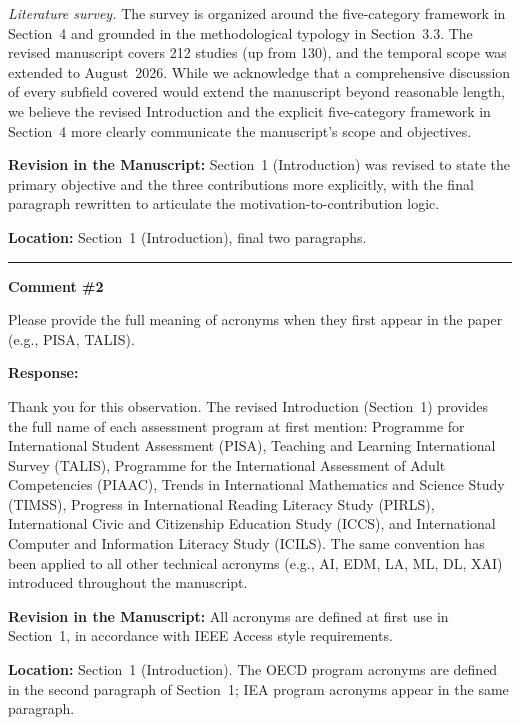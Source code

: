 \documentclass[12pt, a4paper]{article}
\begin{document}
\emph{Literature survey.} The survey is organized around the five-category framework in Section~4
and grounded in the methodological typology in Section~3.3. The revised manuscript covers 212
studies (up from 130), and the temporal scope was extended to August~2026. While we acknowledge
that a comprehensive discussion of every subfield covered would extend the manuscript beyond
reasonable length, we believe the revised Introduction and the explicit five-category framework in
Section~4 more clearly communicate the manuscript's scope and objectives.

\medskip
\noindent\textbf{Revision in the Manuscript:}
Section~1 (Introduction) was revised to state the primary objective and the three contributions
more explicitly, with the final paragraph rewritten to articulate the motivation-to-contribution
logic.

\medskip
\noindent\textbf{Location:} Section~1 (Introduction), final two paragraphs.

\bigskip\hrule\bigskip

\noindent\textbf{Comment \#2}

\medskip
\noindent\textcolor{reviewerblue}{%
Please provide the full meaning of acronyms when they first appear in the paper (e.g., PISA,
TALIS).}

\medskip
\noindent\textbf{Response:}

Thank you for this observation. The revised Introduction (Section~1) provides the full name of each
assessment program at first mention: Programme for International Student Assessment (PISA), Teaching
and Learning International Survey (TALIS), Programme for the International Assessment of Adult
Competencies (PIAAC), Trends in International Mathematics and Science Study (TIMSS), Progress in
International Reading Literacy Study (PIRLS), International Civic and Citizenship Education Study
(ICCS), and International Computer and Information Literacy Study (ICILS). The same convention has
been applied to all other technical acronyms (e.g., AI, EDM, LA, ML, DL, XAI) introduced
throughout the manuscript.

\medskip
\noindent\textbf{Revision in the Manuscript:}
All acronyms are defined at first use in Section~1, in accordance with IEEE Access style
requirements.

\medskip
\noindent\textbf{Location:} Section~1 (Introduction). The OECD program acronyms are defined in the
second paragraph of Section~1; IEA program acronyms appear in the same paragraph.
\end{document}
